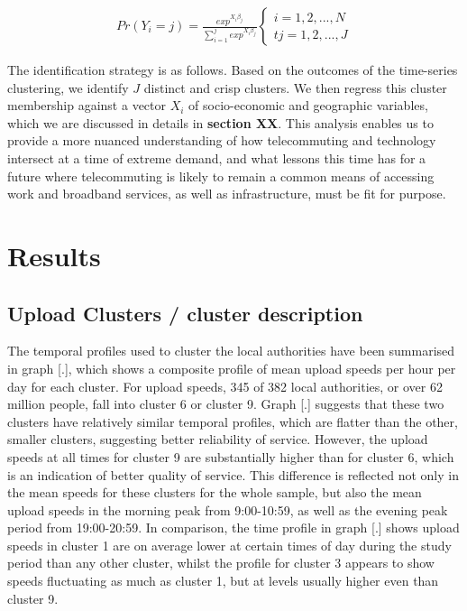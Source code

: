 \documentclass[]{interact}
\theoremstyle{plain}%
\theoremstyle{definition}
\theoremstyle{remark}
\begin{document}
\begin{align}
Pr(Y_{i}=j) = \frac{exp^{X_{i}\beta_{j}}}{\sum_{i=1}^j exp^{X_{i}\beta_{j}}}
\begin{cases}
    i = 1, 2, ... , N \\t
    j = 1, 2, ... , J
\end{cases}\label{eq1}
\end{align}

The identification strategy is as follows. Based on the outcomes of the
time-series clustering, we identify \(J\) distinct and crisp clusters.
We then regress this cluster membership against a vector \(X_{i}\) of
socio-economic and geographic variables, which we are discussed in
details in \textbf{section XX}. This analysis enables us to provide a
more nuanced understanding of how telecommuting and technology intersect
at a time of extreme demand, and what lessons this time has for a future
where telecommuting is likely to remain a common means of accessing work
and broadband services, as well as infrastructure, must be fit for
purpose.

\hypertarget{results}{%
\section{Results}\label{results}}

\hypertarget{upload-clusters-cluster-description}{%
\subsection{Upload Clusters / cluster
description}\label{upload-clusters-cluster-description}}

The temporal profiles used to cluster the local authorities have been
summarised in graph {[}.{]}, which shows a composite profile of mean
upload speeds per hour per day for each cluster. For upload speeds, 345
of 382 local authorities, or over 62 million people, fall into cluster 6
or cluster 9. Graph {[}.{]} suggests that these two clusters have
relatively similar temporal profiles, which are flatter than the other,
smaller clusters, suggesting better reliability of service. However, the
upload speeds at all times for cluster 9 are substantially higher than
for cluster 6, which is an indication of better quality of service. This
difference is reflected not only in the mean speeds for these clusters
for the whole sample, but also the mean upload speeds in the morning
peak from 9:00-10:59, as well as the evening peak period from
19:00-20:59. In comparison, the time profile in graph {[}.{]} shows
upload speeds in cluster 1 are on average lower at certain times of day
during the study period than any other cluster, whilst the profile for
cluster 3 appears to show speeds fluctuating as much as cluster 1, but
at levels usually higher even than cluster 9.
\end{document}
